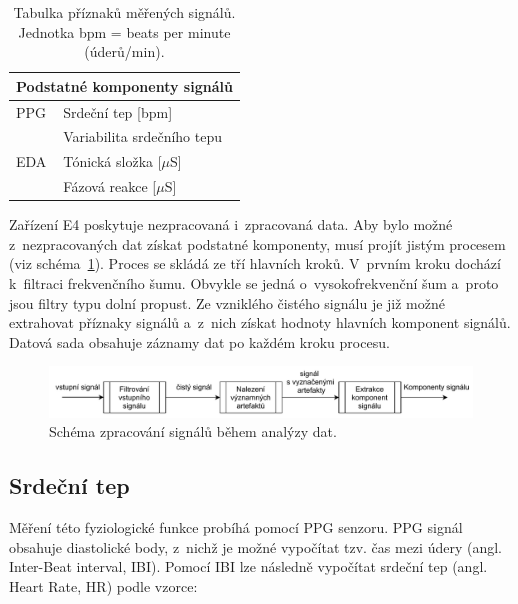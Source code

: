     \begin{table}[H]
    \centering
    \begin{tabular}{ p{5cm} p{7cm}  }
        \hline
         \multicolumn{2}{c}{Podstatné komponenty signálů} \\
         \hline
         \centering
         PPG & Srdeční tep [bpm]\\
             & Variabilita srdečního tepu \\
         \hline
         \centering
         EDA & Tónická složka [$\mu$S]\\
             & Fázová reakce [$\mu$S]\\
         
         \hline
    \end{tabular}
    \caption{Tabulka příznaků měřených signálů. Jednotka bpm = beats per minute (úderů/min).}
    \label{table:priznaky_signalu}
    \end{table}
    
    Zařízení E4 poskytuje nezpracovaná i~zpracovaná data. Aby bylo možné z~nezpracovaných dat získat podstatné komponenty, musí projít jistým procesem (viz schéma~\ref{fig:signal_processing_scheme}). Proces se skládá ze tří hlavních kroků. V~prvním kroku dochází k~filtraci frekvenčního šumu. Obvykle se jedná o~vysokofrekvenční šum a~proto jsou filtry typu dolní propust. Ze vzniklého čistého signálu je již možné extrahovat příznaky signálů a~z~nich získat hodnoty hlavních komponent signálů. Datová sada obsahuje záznamy dat po každém kroku procesu.
    
    \begin{figure}[H]
        \centering
        \includegraphics[width=\textwidth]{obrazky-figures/signal_processing_scheme.pdf}
        \caption{Schéma zpracování signálů během analýzy dat.}
        \label{fig:signal_processing_scheme}
    \end{figure}
    
    
    \subsection{Srdeční tep}
    Měření této fyziologické funkce probíhá pomocí PPG senzoru. PPG signál obsahuje diastolické body, z~nichž je možné vypočítat tzv. čas mezi údery (angl. Inter-Beat interval, IBI). Pomocí IBI lze následně vypočítat srdeční tep (angl. Heart Rate, HR) podle vzorce: 
    
